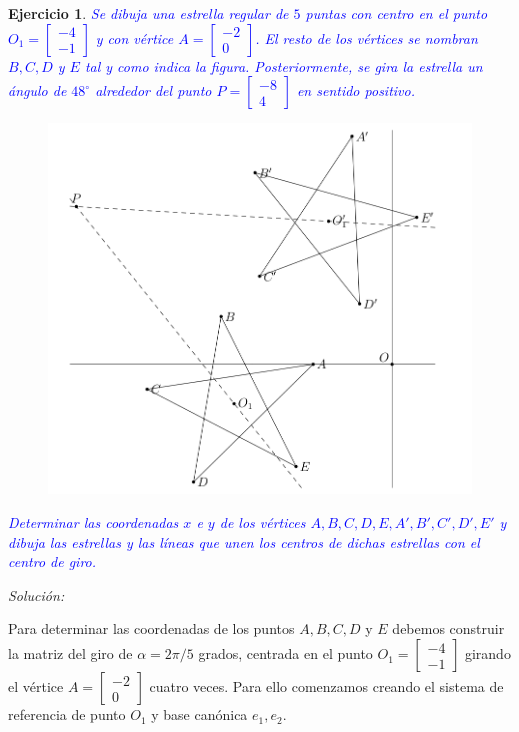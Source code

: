 \documentclass{amsart}
\newtheorem{ejer}{Ejercicio}
\begin{document}
\begin{ejer}
\textcolor{blue}{Se dibuja una estrella regular de $5$ puntas con centro en el punto $O_1 = \left[ \begin{array}{r} -4 \\ -1 \end{array} \right]$ y con vértice $A = \left[ \begin{array}{r} -2 \\ 0 \end{array} \right]$. El resto de los vértices se nombran $B, C, D$ y $E$ tal y como indica la figura. Posteriormente, se gira la estrella un ángulo de $48^\circ $ alrededor del punto $P = \left[ \begin{array}{r} -8 \\ 4 \end{array} \right]$ en sentido positivo.}

\begin{figure}[H]
\centering
\includegraphics[width = 12cm]{estrella.png}
\end{figure}

\textcolor{blue}{Determinar las coordenadas $x$ e $y$ de los vértices $A,B,C,D,E,A',B',C',D',E'$ y dibuja las estrellas y las líneas que unen los centros de dichas estrellas con el centro de giro.}
\end{ejer}

{\it Solución:}

Para determinar las coordenadas de los puntos $A,B,C,D$ y $E$ debemos construir la matriz del giro de $\alpha = 2\pi/5$ grados, centrada en el punto $O_1 = \left[\begin{array}{c} -4 \\ -1 \end{array} \right] $ girando el vértice $A = \left[\begin{array}{c} -2 \\ 0 \end{array} \right] $ cuatro veces. Para ello comenzamos creando el sistema de referencia de punto $O_1$ y base canónica $e_1,e_2$.
\end{document}
